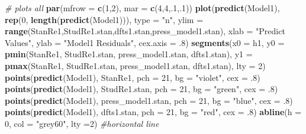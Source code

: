 \documentclass[]{article}
\newenvironment{Shaded}{\begin{snugshade}}{\end{snugshade}}
\newcommand{\KeywordTok}[1]{\textcolor[rgb]{0.13,0.29,0.53}{\textbf{#1}}}
\newcommand{\DataTypeTok}[1]{\textcolor[rgb]{0.13,0.29,0.53}{#1}}
\newcommand{\DecValTok}[1]{\textcolor[rgb]{0.00,0.00,0.81}{#1}}
\newcommand{\StringTok}[1]{\textcolor[rgb]{0.31,0.60,0.02}{#1}}
\newcommand{\CommentTok}[1]{\textcolor[rgb]{0.56,0.35,0.01}{\textit{#1}}}
\newcommand{\NormalTok}[1]{#1}
\begin{document}
\begin{Shaded}
\begin{Highlighting}[]
\CommentTok{# plots all }
\KeywordTok{par}\NormalTok{(}\DataTypeTok{mfrow =} \KeywordTok{c}\NormalTok{(}\DecValTok{1}\NormalTok{,}\DecValTok{2}\NormalTok{), }\DataTypeTok{mar =} \KeywordTok{c}\NormalTok{(}\DecValTok{4}\NormalTok{,}\DecValTok{4}\NormalTok{,.}\DecValTok{1}\NormalTok{,.}\DecValTok{1}\NormalTok{))}
\KeywordTok{plot}\NormalTok{(}\KeywordTok{predict}\NormalTok{(Model1), }\KeywordTok{rep}\NormalTok{(}\DecValTok{0}\NormalTok{, }\KeywordTok{length}\NormalTok{(}\KeywordTok{predict}\NormalTok{(Model1))),}
     \DataTypeTok{type =} \StringTok{"n"}\NormalTok{,}
     \DataTypeTok{ylim =} \KeywordTok{range}\NormalTok{(StanRe1,StudRe1.stan,dfts1.stan,press_model1.stan),}
     \DataTypeTok{xlab =} \StringTok{"Predict Values"}\NormalTok{, }
     \DataTypeTok{ylab =} \StringTok{"Model1 Residuals"}\NormalTok{, }
     \DataTypeTok{cex.axis =}\NormalTok{ .}\DecValTok{8}\NormalTok{)}
\KeywordTok{segments}\NormalTok{(}\DataTypeTok{x0 =}\NormalTok{ h1,}
        \DataTypeTok{y0 =} \KeywordTok{pmin}\NormalTok{(StanRe1, StudRe1.stan, press_model1.stan, dfts1.stan),}
        \DataTypeTok{y1 =} \KeywordTok{pmax}\NormalTok{(StanRe1, StudRe1.stan, press_model1.stan, dfts1.stan),}
        \DataTypeTok{lty =} \DecValTok{2}\NormalTok{)}
\KeywordTok{points}\NormalTok{(}\KeywordTok{predict}\NormalTok{(Model1), StanRe1, }\DataTypeTok{pch =} \DecValTok{21}\NormalTok{, }\DataTypeTok{bg =} \StringTok{"violet"}\NormalTok{, }\DataTypeTok{cex =}\NormalTok{ .}\DecValTok{8}\NormalTok{)}
\KeywordTok{points}\NormalTok{(}\KeywordTok{predict}\NormalTok{(Model1), StudRe1.stan, }\DataTypeTok{pch =} \DecValTok{21}\NormalTok{, }\DataTypeTok{bg =} \StringTok{"green"}\NormalTok{, }\DataTypeTok{cex =}\NormalTok{ .}\DecValTok{8}\NormalTok{)}
\KeywordTok{points}\NormalTok{(}\KeywordTok{predict}\NormalTok{(Model1), press_model1.stan, }\DataTypeTok{pch =} \DecValTok{21}\NormalTok{, }\DataTypeTok{bg =} \StringTok{"blue"}\NormalTok{, }\DataTypeTok{cex =}\NormalTok{ .}\DecValTok{8}\NormalTok{)}
\KeywordTok{points}\NormalTok{(}\KeywordTok{predict}\NormalTok{(Model1), dfts1.stan, }\DataTypeTok{pch =} \DecValTok{21}\NormalTok{, }\DataTypeTok{bg =} \StringTok{"red"}\NormalTok{, }\DataTypeTok{cex =}\NormalTok{ .}\DecValTok{8}\NormalTok{)}
\KeywordTok{abline}\NormalTok{(}\DataTypeTok{h =} \DecValTok{0}\NormalTok{, }\DataTypeTok{col =} \StringTok{"grey60"}\NormalTok{, }\DataTypeTok{lty =}\DecValTok{2}\NormalTok{) }\CommentTok{#horizontal line}


\end{Highlighting}
\end{Shaded}
\end{document}
